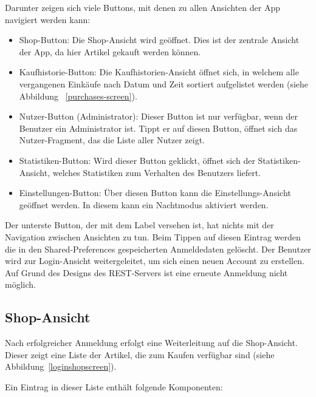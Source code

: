 Darunter zeigen sich viele Buttons, mit denen zu allen Ansichten der App navigiert werden kann:

\begin{itemize}
	\item Shop-Button: Die Shop-Ansicht wird geöffnet.
	Dies ist der zentrale Ansicht der App, da hier Artikel gekauft werden können.

	\item Kaufhistorie-Button: Die Kaufhistorien-Ansicht öffnet sich, in welchem alle vergangenen Einkäufe nach Datum und Zeit sortiert aufgelistet werden (siehe Abbildung ~\ref{purchases-screen}).

	\item Nutzer-Button (Administrator): Dieser Button ist nur verfügbar, wenn der Benutzer ein Administrator ist.
	Tippt er auf diesen Button, öffnet sich das Nutzer-Fragment, das die Liste aller Nutzer zeigt.

	\item Statistiken-Button: Wird dieser Button geklickt, öffnet sich der Statistiken-Ansicht, welches Statistiken zum Verhalten des Benutzers liefert.

	\item Einstellungen-Button: Über diesen Button kann die Einstellungs-Ansicht geöffnet werden.
	In diesem kann ein Nachtmodus aktiviert werden.

\end{itemize}

Der unterste Button, der mit dem Label  versehen ist, hat nichts mit der Navigation zwischen Ansichten zu tun.
Beim Tippen auf diesen Eintrag werden die in den Shared-Preferences gespeicherten Anmeldedaten gelöscht.
Der Benutzer wird zur Login-Ansicht weitergeleitet, um sich einen neuen Account zu erstellen.
Auf Grund des Designs des REST-Servers ist eine erneute Anmeldung nicht möglich.

\subsection{Shop-Ansicht}\label{subsec:shop-screen}

Nach erfolgreicher Anmeldung erfolgt eine Weiterleitung auf die Shop-Ansicht.
Dieser zeigt eine Liste der Artikel, die zum Kaufen verfügbar sind (siehe Abbildung~\ref{loginshopscreen}).

Ein Eintrag in dieser Liste enthält folgende Komponenten:

